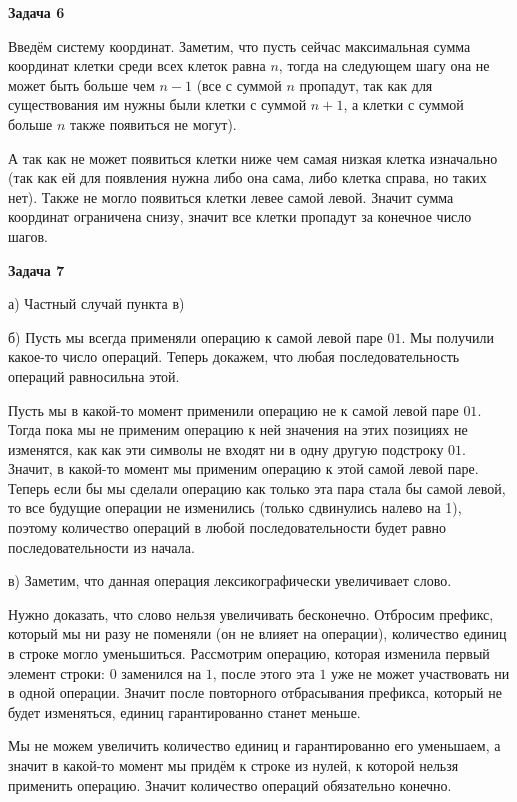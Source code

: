 \begin{center}
    \textbf{Задача 6}
\end{center}
Введём систему координат. Заметим, что пусть сейчас максимальная сумма координат клетки среди всех клеток равна $\displaystyle n$, тогда на следующем шагу она не может быть больше чем $\displaystyle n-1$ (все с суммой $\displaystyle n$ пропадут, так как для существования им нужны были клетки с суммой $\displaystyle n+1$, а клетки с суммой больше $\displaystyle n$ также появиться не могут).

А так как не может появиться клетки ниже чем самая низкая клетка изначально (так как ей для появления нужна либо она сама, либо клетка справа, но таких нет). Также не могло появиться клетки левее самой левой. Значит сумма координат ограничена снизу, значит все клетки пропадут за конечное число шагов.

\begin{center}
    \textbf{Задача 7}
\end{center}

а) Частный случай пункта в)

б) Пусть мы всегда применяли операцию к самой левой паре $\displaystyle 01$. Мы получили какое-то число операций. Теперь докажем, что любая последовательность операций равносильна этой.

Пусть мы в какой-то момент применили операцию не к самой левой паре $\displaystyle 01$. Тогда пока мы не применим операцию к ней значения на этих позициях не изменятся, как как эти символы не входят ни в одну другую подстроку $\displaystyle 01$. Значит, в какой-то момент мы применим операцию к этой самой левой паре. Теперь если бы мы сделали операцию как только эта пара стала бы самой левой, то все будущие операции не изменились (только сдвинулись налево на 1), поэтому количество операций в любой последовательности будет равно последовательности из начала.

в) Заметим, что данная операция лексикографически увеличивает слово.

Нужно доказать, что слово нельзя увеличивать бесконечно. Отбросим префикс, который мы ни разу не поменяли (он не влияет на операции), количество единиц в строке могло уменьшиться. Рассмотрим операцию, которая изменила первый элемент строки: $\displaystyle 0$ заменился на $\displaystyle 1$, после этого эта $\displaystyle 1$ уже не может участвовать ни в одной операции. Значит после повторного отбрасывания префикса, который не будет изменяться, единиц гарантированно станет меньше.

Мы не можем увеличить количество единиц и гарантированно его уменьшаем, а значит в какой-то момент мы придём к строке из нулей, к которой нельзя применить операцию. Значит количество операций обязательно конечно. 
